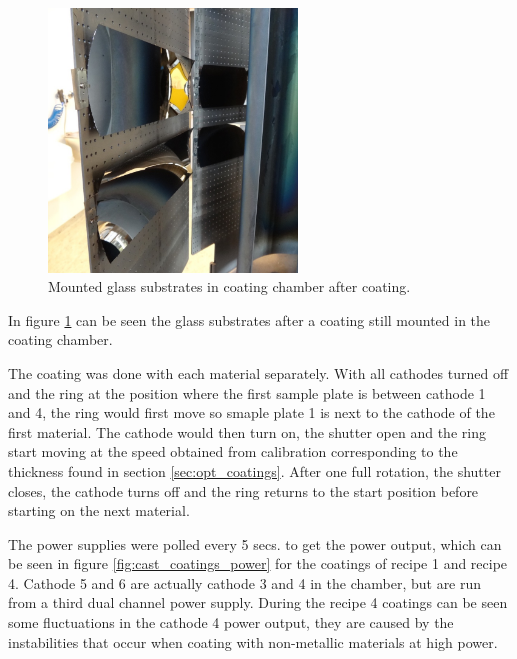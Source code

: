 \begin{figure}[htbp]
  \centering
    \includegraphics[height=7cm]{figures/cast/coated_pieces.jpg}
  \caption{\footnotesize Mounted glass substrates in coating chamber after coating. }
  \label{fig:coated_pieces}
\end{figure}

In figure \ref{fig:coated_pieces} can be seen the glass substrates after a coating still mounted in the coating chamber.

The coating was done with each material separately. With all cathodes turned off and the ring at the position where the first sample plate is between cathode 1 and 4, the ring would first move so smaple plate 1 is next to the cathode of the first material. The cathode would then turn on, the shutter open and the ring start moving at the speed obtained from calibration corresponding to the thickness found in section \ref{sec:opt_coatings}. After one full rotation, the shutter closes, the cathode turns off and the ring returns to the start position before starting on the next material.

The power supplies were polled every 5 secs. to get the power output, which can be seen in figure \ref{fig:cast_coatings_power} for the coatings of recipe 1 and recipe 4. Cathode 5 and 6 are actually cathode 3 and 4 in the chamber, but are run from a third dual channel power supply. During the recipe 4 coatings can be seen some fluctuations in the cathode 4 power output, they are caused by the  instabilities that occur when coating with non-metallic materials at high power.

